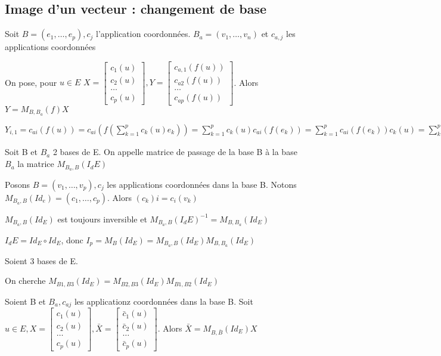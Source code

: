 \documentclass[french]{yLectureNote}
\begin{document}
\subsection{Image d'un vecteur : changement de base}
Soit \(B = (e_1,\dots,e_p), c_j\) l'application coordonnées. \(B_a = (v_1,\dots, v_n)\) et \(c_{a,j}\) les applications coordonnées
\begin{proposition}
On pose, pour \(u\in E\) \(X = \begin{bmatrix}c_1(u)\\c_2(u)\\\dots\\c_p(u)\end{bmatrix}, Y = \begin{bmatrix}c_{a,1}(f(u))\\c_{a2}(f(u))\\\dots\\c_{ap}(f(u))\end{bmatrix}\). Alors\(Y = M_{B,B_a}(f)X\)
\end{proposition}
\begin{myproof}
 \(Y_{i,1} = c_{ai}(f(u)) =  c_{ai}(f(\sum^p_{k=1} c_k(u)e_k)) = \sum^p_{k=1} c_k(u) c_{ai}(f(e_k)) = \sum^p_{k=1} c_{ai}(f(e_k)) c_k(u) = \sum^p_{k=1}(M_{B,b_a}(f))_{ik}X_{k1} = (M_{B,B_a}X)_{i1}\)
\end{myproof}
\begin{definition}
Soit B et \(B_a\) 2 bases de E. On appelle matrice de passage de la base B à la base \(B_a\) la matrice \(M_{B_a,B}(I_dE)\)
\end{definition}
\begin{proposition}
Posons \(B  = (v_1, \dots,v_p), c_j\) les applications coordonnées dans la base B. Notons \(M_{B_a,B}(Id_e) = (c_1,\dots, c_p)\). Alors \((c_k)i = c_i(v_k)\)
\end{proposition}
\begin{proposition}
\(M_{B_a,B}(Id_E)\) est toujours inversible et \(M_{B_a,B}(I_dE)^{-1} = M_{B,B_a}(Id_E)\)
\end{proposition}
\begin{myproof}
 \(I_dE = Id_E\circ Id_E\), donc \(I_p = M_B(Id_E) = M_{B_a,B}(Id_E)M_{B,B_a}(Id_E)\)
\end{myproof}
\begin{proposition}
Soient 3 bases de E.

On cherche \(M_{B1,B3}(Id_E) = M_{B2,B3}(Id_E)M_{B1,B2}(Id_E)\)
\end{proposition}
\begin{proposition}
Soient B et \(B_a, c_{aj}\) les applicationz coordonnées dans la base B. Soit \(u \in E, X = \begin{bmatrix}c_1(u)\\c_2(u)\\\dots\\c_p(u)\end{bmatrix},  \bar{X} = \begin{bmatrix}\bar{c}_1(u)\\\bar{c}_2(u)\\\dots\\\bar{c}_p(u)\end{bmatrix}\). Alors \(\bar{X} = M_{B, \bar{B}}(Id_E)X\)
\end{proposition}
\end{document}
